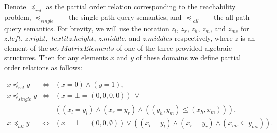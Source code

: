 Denote $\preceq_{\textit{rel}}$ as the partial order relation corresponding to the reachability problem, $\preceq_{\textit{single}}$~--- the single-path query semantics, and $\preceq_{\textit{ all}}$~--- the all-path query semantics. For brevity, we will use the notation $z_l$, $z_r$, $z_h$, $z_m$, and $z_{ms}$ for $\textit{z.left}$, $\textit{z.right}$, $\ textit{z.height}$, $\textit{z.middle}$, and $\textit{z.middles}$ respectively, where $z$ is an element of the set $\textit{MatrixElements}$ of one of the three provided algebraic structures. Then for any elements $x$ and $y$ of these domains we define partial order relations as follows:

$$
\begin{array}{lcl}
   x \preceq_{\textit{rel}} y & \iff & (x = 0) \wedge (y = 1), \\ 
   x \preceq_{\textit{single}} y & \iff & (x = \bot = (0, 0, 0, 0)) \ \vee \\ 
    & & ((x_l = y_l) \wedge (x_r = y_r ) \wedge ((y_h, y_m) \leq (x_h, x_m)) ), \\ 
   x \preceq_{\textit{all}} y  & \iff & (x = \bot = (0, 0, \emptyset)) \vee ((x_l = y_l) \wedge (x_r = y_r) \wedge (x_{ms} \subseteq y_{ms}) ). \\ 
\end{array}
$$



